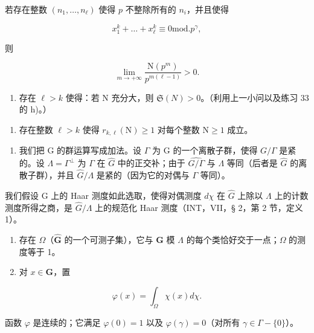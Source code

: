 若存在整数 \((n_1, \ldots, n_\ell)\) 使得 \(p\) 不整除所有的 \(n_i\)，并且使得

\[
x _ {1} ^ {k} + \dots + x _ {\ell} ^ {k} \equiv 0 \mathrm{mod.} p ^ {\gamma},
\]

则

\[
\lim _ {m \to + \infty} \frac {\mathrm{N} (p ^ {m})}{p ^ {m (\ell - 1)}} > 0.
\]

\begin{enumerate}
\def\labelenumi{\roman{enumi})}
\tightlist
\item
  存在 \(\ell > k\) 使得：若 N 充分大，则 \(\mathfrak{S}(N) > 0\)。（利用上一小问以及练习 33 的 h)。）
\end{enumerate}

\begin{enumerate}
\def\labelenumi{\alph{enumi})}
\setcounter{enumi}{9}
\tightlist
\item
  存在整数 \(\ell > k\) 使得 \(r_{k,\ell}(\mathrm{N}) \geqslant 1\) 对每个整数 \(\mathrm{N} \geqslant 1\) 成立。
\end{enumerate}

\begin{enumerate}
\def\labelenumi{\arabic{enumi})}
\setcounter{enumi}{67}
\tightlist
\item
  我们把 G 的群运算写成加法。设 \(\Gamma\) 为 G 的一个离散子群，使得 \(G / \Gamma\) 是紧的。设 \(\Lambda = \Gamma^{\perp}\) 为 \(\Gamma\) 在 \(\widehat{G}\) 中的正交补；由于 \(\widehat{G / \Gamma}\) 与 \(\Lambda\) 等同（后者是 \(\widehat{G}\) 的离散子群），并且 \(\widehat{G} / \Lambda\) 是紧的（因为它的对偶与 \(\Gamma\) 等同）。
\end{enumerate}

我们假设 G 上的 Haar 测度如此选取，使得对偶测度 \(d\chi\) 在 \(\widehat{G}\) 上除以 \(\Lambda\) 上的计数测度所得之商，是 \(\widehat{G}/\Lambda\) 上的规范化 Haar 测度（INT，VII，§ 2，第 2 节，定义 1）。

\begin{enumerate}
\def\labelenumi{\alph{enumi})}
\item
  存在 \(\Omega\)（\(\widehat{\mathbf{G}}\) 的一个可测子集），它与 \(\mathbf{G}\) 模 \(\Lambda\) 的每个类恰好交于一点；\(\Omega\) 的测度等于 1。
\item
  对 \(x\in \mathbf{G}\)，置
\end{enumerate}

\[
\varphi (x) = \int_ {\Omega} \chi (x) d \chi .
\]

函数 \(\varphi\) 是连续的；它满足 \(\varphi(0) = 1\) 以及 \(\varphi(\gamma) = 0\)（对所有 \(\gamma \in \Gamma - \{0\}\)）。

